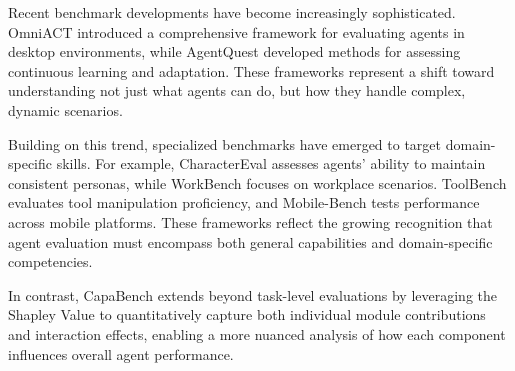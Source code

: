 Recent benchmark developments have become increasingly sophisticated. OmniACT \citep{zhang2024omniact} introduced a comprehensive framework for evaluating agents in desktop environments, while AgentQuest \citep{yang2024agentquest} developed methods for assessing continuous learning and adaptation. These frameworks represent a shift toward understanding not just what agents can do, but how they handle complex, dynamic scenarios.

Building on this trend, specialized benchmarks have emerged to target domain-specific skills. For example, CharacterEval \citep{chen2024charactereval} assesses agents' ability to maintain consistent personas, while WorkBench \citep{liu2024workbench} focuses on workplace scenarios. ToolBench \citep{guo2024stabletoolbench} evaluates tool manipulation proficiency, and Mobile-Bench \citep{wang2024mobilebench} tests performance across mobile platforms. These frameworks reflect the growing recognition that agent evaluation must encompass both general capabilities and domain-specific competencies.

In contrast, CapaBench extends beyond task-level evaluations by leveraging the Shapley Value to quantitatively capture both individual module contributions and interaction effects, enabling a more nuanced analysis of how each component influences overall agent performance.